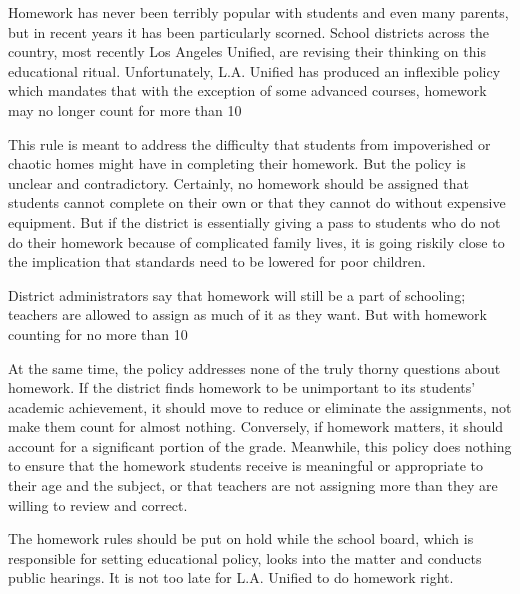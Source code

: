 Homework has never been terribly popular with students and even many parents, but in recent years it has been particularly scorned. School districts across the country, most recently Los Angeles Unified, are revising their thinking on this educational ritual. Unfortunately, L.A. Unified has produced an inflexible policy which mandates that with the exception of some advanced courses, homework may no longer count for more than 10%


This rule is meant to address the difficulty that students from impoverished or chaotic homes might have in completing their homework. But the policy is unclear and contradictory. Certainly, no homework should be assigned that students cannot complete on their own or that they cannot do without expensive equipment. But if the district is essentially giving a pass to students who do not do their homework because of complicated family lives, it is going riskily close to the implication that standards need to be lowered for poor children.


District administrators say that homework will still be a part of schooling; teachers are allowed to assign as much of it as they want. But with homework counting for no more than 10%


At the same time, the policy addresses none of the truly thorny questions about homework. If the district finds homework to be unimportant to its students' academic achievement, it should move to reduce or eliminate the assignments, not make them count for almost nothing. Conversely, if homework matters, it should account for a significant portion of the grade. Meanwhile, this policy does nothing to ensure that the homework students receive is meaningful or appropriate to their age and the subject, or that teachers are not assigning more than they are willing to review and correct.


The homework rules should be put on hold while the school board, which is responsible for setting educational policy, looks into the matter and conducts public hearings. It is not too late for L.A. Unified to do homework right.


